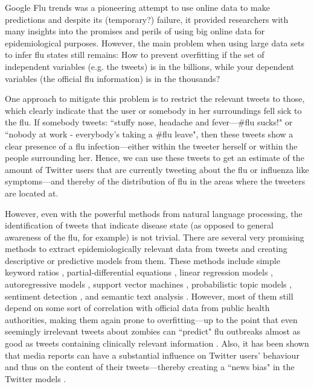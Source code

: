 \documentclass[11pt, a4paper,twoside]{report}\usepackage[]{graphicx}\usepackage[]{color}
\begin{document}
Google Flu trends was a pioneering attempt to use online data to make predictions and despite its (temporary?) failure, it provided researchers with many insights into the promises and perils of using big online data for epidemiological purposes. However, the main problem when using large data sets to infer flu states still remains: How to prevent overfitting if the set of independent variables (e.g. the tweets) is in the billions, while your dependent variables (the official flu information) is in the thousands?

One approach to mitigate this problem is to restrict the relevant tweets to those, which clearly indicate that the user or somebody in her surroundings fell sick to the flu. If somebody tweets: ``stuffy nose, headache and fever---\#flu sucks!" or ``nobody at work - everybody's taking a \#flu leave", then these tweets show a clear presence of a flu infection---either within the tweeter herself or within the people surrounding her. Hence, we can use these tweets to get an estimate of the amount of Twitter users that are currently tweeting about the flu or influenza like symptoms---and thereby of the distribution of flu in the areas where the tweeters are located at.

However, even with the powerful methods from natural language processing, the identification of tweets that indicate disease state (as opposed to general awareness of the flu, for example) is not trivial. There are several very promising methods to extract epidemiologically relevant data from tweets and creating descriptive or predictive models from them. These methods include simple keyword ratios \citep{lampos_tracking_2010}, partial-differential equations \citep{wang_regional_2016}, linear regression models \citep{culotta_towards_2010}, autoregressive models \citep{achrekar_predicting_2011,paul_twitter_2014,paul_worldwide_2015}, support vector machines \citep{paul_you_2011}, probabilistic topic models \citep{paul_you_2011}, sentiment detection \citep{aramaki_twitter_2011}, and semantic text analysis \citep{lamb_separating_2013}. However, most of them still depend on some sort of correlation with official data from public health authorities, making them again prone to overfitting---up to the point that even seemingly irrelevant tweets about zombies can ``predict" flu outbreaks almost as good as tweets containing clinically relevant information \citep{bodnar_validating_2013}. Also, it has been shown that media reports can have a substantial influence on Twitter users' behaviour and thus on the content of their tweets---thereby creating a ``news bias" in the Twitter models \citep{aramaki_twitter_2011}.
\end{document}
